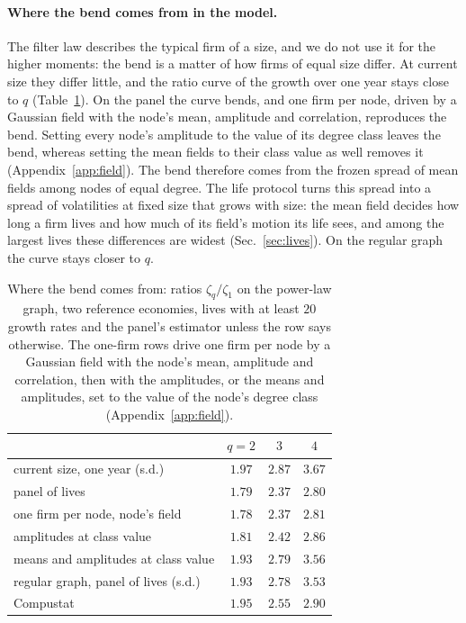 \documentclass[pre,twocolumn,superscriptaddress,nofootinbib]{revtex4-2}
\begin{document}
\paragraph{Where the bend comes from in the model.}  The filter law describes the typical firm of a size, and we do
not use it for the higher moments: the bend is a matter of how firms of equal size differ.  At current size they
differ little, and the ratio curve of the growth over one year stays close to $q$ (Table~\ref{tab:bend}).  On the
panel the curve bends, and one firm per node, driven by a Gaussian field with the node's mean, amplitude and
correlation, reproduces the bend.  Setting every node's amplitude to the value of its degree class leaves the bend,
whereas setting the mean fields to their class value as well removes it (Appendix~\ref{app:field}).  The bend
therefore comes from the frozen spread of mean fields among nodes of equal degree.  The life protocol turns this
spread into a spread of volatilities at fixed size that grows with size: the mean field decides how long a firm
lives and how much of its field's motion its life sees, and among the largest lives these differences are widest
(Sec.~\ref{sec:lives}).  On the regular graph the curve stays closer to $q$.

\begin{table}[t]
\caption{Where the bend comes from: ratios $\zeta_q/\zeta_1$ on the power-law graph, two reference economies, lives
with at least $20$ growth rates and the panel's estimator unless the row says otherwise.  The one-firm rows drive one
firm per node by a Gaussian field with the node's mean, amplitude and correlation, then with the
amplitudes, or the means and amplitudes, set to the value of the node's degree class (Appendix~\ref{app:field}).}
\label{tab:bend}
\begin{ruledtabular}
\begin{tabular}{lccc}
 & $q=2$ & $3$ & $4$\\
\hline
current size, one year (s.d.) & $1.97$ & $2.87$ & $3.67$\\
panel of lives & $1.79$ & $2.37$ & $2.80$\\
one firm per node, node's field & $1.78$ & $2.37$ & $2.81$\\
\quad amplitudes at class value & $1.81$ & $2.42$ & $2.86$\\
\quad means and amplitudes at class value & $1.93$ & $2.79$ & $3.56$\\
regular graph, panel of lives (s.d.) & $1.93$ & $2.78$ & $3.53$\\
Compustat \cite{moran2024} & $1.95$ & $2.55$ & $2.90$\\
\end{tabular}
\end{ruledtabular}
\end{table}
\end{document}
